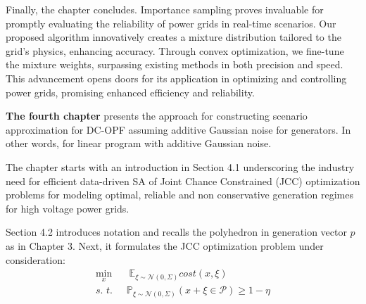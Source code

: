 Finally, the chapter concludes. Importance sampling proves invaluable for promptly evaluating the reliability of power grids in real-time scenarios. Our proposed algorithm innovatively creates a mixture distribution tailored to the grid's physics, enhancing accuracy. Through convex optimization, we fine-tune the mixture weights, surpassing existing methods in both precision and speed. This advancement opens doors for its application in optimizing and controlling power grids, promising enhanced efficiency and reliability.

\textbf{The fourth chapter} presents the approach for constructing scenario approximation for DC-OPF assuming additive Gaussian noise for generators. In other words, for linear program with additive Gaussian noise. 

The chapter starts with an introduction in Section 4.1 underscoring the industry need for efficient data-driven SA of Joint Chance Constrained (JCC) optimization problems for modeling optimal, reliable and non conservative generation regimes for high voltage power grids. 

Section 4.2 introduces notation and recalls the polyhedron in generation vector $p$ as in Chapter 3. Next, it formulates the JCC optimization problem under consideration:
\begin{equation}\label{eq:JCC-OPF}
    \begin{aligned}
  \min_x & \;\mathbb{E}_{\xi\sim \mathcal{N}(0, \Sigma)} \textit{cost}(x,\xi)\\
   \textit{s. t. }\; & \mathbb{P}_{\xi\sim \mathcal{N}(0, \Sigma)} (x+\xi \in \mathcal{P}) \ge 1 - \eta
   \end{aligned}
\end{equation}

